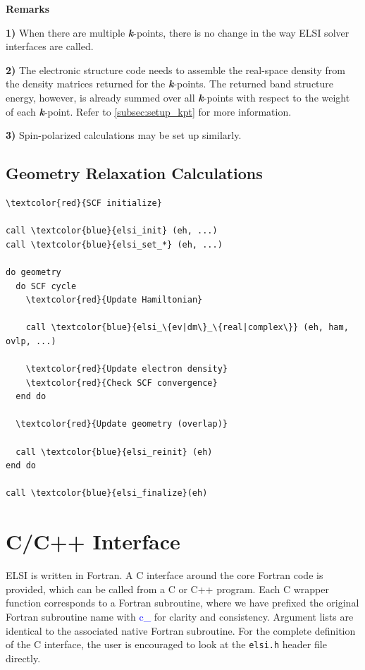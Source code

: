 \documentclass{report}
\begin{document}
\textbf{Remarks}

\textbf{1)} When there are multiple \textbf{\textit{k}}-points, there is no change in the way ELSI solver interfaces are called.

\textbf{2)} The electronic structure code needs to assemble the real-space density from the density matrices returned for the \textbf{\textit{k}}-points.  The returned band structure energy, however, is already summed over all \textbf{\textit{k}}-points with respect to the weight of each \textbf{\textit{k}}-point.  Refer to \ref{subsec:setup_kpt} for more information.

\textbf{3)} Spin-polarized calculations may be set up similarly.

\subsection*{Geometry Relaxation Calculations}
\begin{tcolorbox}
\begin{Verbatim}[commandchars=\\\{\}]
\textcolor{red}{SCF initialize}

call \textcolor{blue}{elsi_init} (eh, ...)
call \textcolor{blue}{elsi_set_*} (eh, ...)

do geometry
  do SCF cycle
    \textcolor{red}{Update Hamiltonian}

    call \textcolor{blue}{elsi_\{ev|dm\}_\{real|complex\}} (eh, ham, ovlp, ...)

    \textcolor{red}{Update electron density}
    \textcolor{red}{Check SCF convergence}
  end do

  \textcolor{red}{Update geometry (overlap)}

  call \textcolor{blue}{elsi_reinit} (eh)
end do

call \textcolor{blue}{elsi_finalize}(eh)
\end{Verbatim}
\end{tcolorbox}

\section{C/C++ Interface}
\label{sec:c}
ELSI is written in Fortran.  A C interface around the core Fortran code is provided, which can be called from a C or C++ program.  Each C wrapper function corresponds to a Fortran subroutine, where we have prefixed the original Fortran subroutine name with \textcolor{blue}{c\_} for clarity and consistency.  Argument lists are identical to the associated native Fortran subroutine.  For the complete definition of the C interface, the user is encouraged to look at the \texttt{elsi.h} header file directly.
\end{document}
